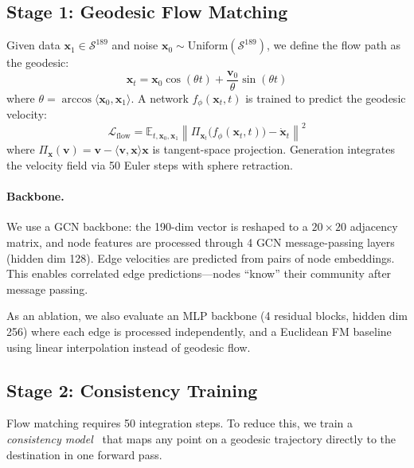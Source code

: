 \documentclass[10pt, twocolumn]{article}
\begin{document}
\subsection{Stage 1: Geodesic Flow Matching}

Given data $\mathbf{x}_1 \in \mathcal{S}^{189}$ and noise $\mathbf{x}_0 \sim \text{Uniform}(\mathcal{S}^{189})$, we define the flow path as the geodesic:
\begin{equation}
    \mathbf{x}_t = \mathbf{x}_0 \cos(\theta t) + \frac{\mathbf{v}_0}{\theta} \sin(\theta t)
\end{equation}
where $\theta = \arccos\langle \mathbf{x}_0, \mathbf{x}_1 \rangle$. A network $f_\phi(\mathbf{x}_t, t)$ is trained to predict the geodesic velocity:
\begin{equation}
    \mathcal{L}_{\text{flow}} = \mathbb{E}_{t,\mathbf{x}_0,\mathbf{x}_1} \left\| \Pi_{\mathbf{x}_t}\!\big(f_\phi(\mathbf{x}_t, t)\big) - \dot{\mathbf{x}}_t \right\|^2
\end{equation}
where $\Pi_{\mathbf{x}}(\mathbf{v}) = \mathbf{v} - \langle \mathbf{v}, \mathbf{x} \rangle \mathbf{x}$ is tangent-space projection. Generation integrates the velocity field via 50 Euler steps with sphere retraction.

\paragraph{Backbone.}
We use a GCN backbone: the 190-dim vector is reshaped to a $20{\times}20$ adjacency matrix, and node features are processed through 4 GCN message-passing layers (hidden dim 128). Edge velocities are predicted from pairs of node embeddings. This enables correlated edge predictions---nodes ``know'' their community after message passing.

As an ablation, we also evaluate an MLP backbone (4 residual blocks, hidden dim 256) where each edge is processed independently, and a Euclidean FM baseline using linear interpolation instead of geodesic flow.

\subsection{Stage 2: Consistency Training}

Flow matching requires 50 integration steps. To reduce this, we train a \emph{consistency model}~\cite{song2023consistency} that maps any point on a geodesic trajectory directly to the destination in one forward pass.
\end{document}
